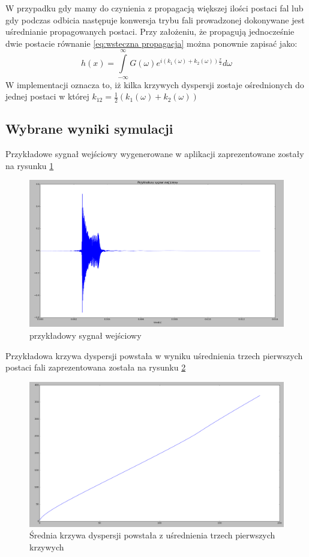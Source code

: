 W przypadku gdy mamy do czynienia z propagacją większej ilości postaci fal lub gdy podczas odbicia następuje konwersja trybu fali prowadzonej dokonywane jest uśrednianie propagowanych postaci. Przy założeniu, że propagują jednocześnie dwie postacie równanie \ref{eq:wsteczna propagacja} można ponownie zapisać jako:
\begin{equation}
h(x) = \int\limits _{-\infty}^{\infty}G(\omega)e^{i(k_1(\omega)+k_2(\omega))\frac{x}{2}}d\omega \label{eq:wiele postaci}
\end{equation}
W implementacji oznacza to, iż kilka krzywych dyspersji zostaje ośrednionych do jednej postaci w której $k_{12} = \frac{1}{2}(k_1(\omega) + k_2(\omega))$
\subsection{Wybrane wyniki symulacji}
Przykładowe sygnał wejściowy wygenerowane w aplikacji zaprezentowane zostały na rysunku \ref{fig:przykl_we}
\begin{figure}[h]
\centering
\includegraphics[width=14cm]{Zdjecia/4/przykl_we}
\caption{przykładowy sygnał wejściowy}
\label{fig:przykl_we}
\end{figure}
Przykładowa krzywa dyspersji powstała w wyniku uśrednienia trzech pierwszych postaci fali zaprezentowana została na rysunku \ref{fig:mean}
\begin{figure}[h]
\centering
\includegraphics[width=14cm]{Zdjecia/4/meanmode}
\caption{Średnia krzywa dyspersji powstała z uśrednienia trzech pierwszych krzywych}
\label{fig:mean}
\end{figure}
